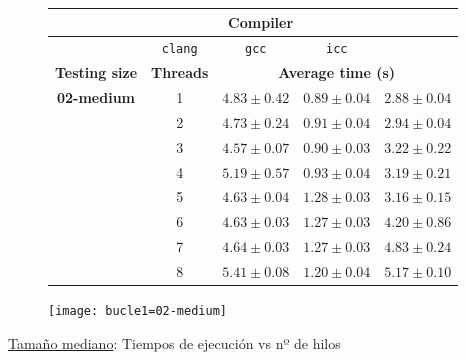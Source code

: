 \begin{figure}[H]
    \centering
    \begin{subfigure}{0.4\textwidth}
        \begin{adjustbox}{width=\textwidth} 
        \begin{tabular}{|c|c|c|c|c|}
            \hline
            \rowcolor{azul} \multicolumn{2}{|c|}{}&\multicolumn{3}{c|}{\textbf{Compiler}} \\ \hline
            \rowcolor{azul} \multicolumn{2}{|c|}{}&\texttt{clang}&\texttt{gcc}&\texttt{icc}\\ \hline
            \rowcolor{azul} \textbf{Testing size} & \textbf{Threads}&\multicolumn{3}{c|}{\textbf{Average time (s)}} \\ \hline
            \multirow{8}{2.5cm}{\textbf{02-medium}} & 1 & \(4.83\pm{0.42}\) & \(0.89\pm{0.04}\) & \(2.88\pm{0.04}\) \\ \cline{2-5}
            & 2 & \(4.73\pm{0.24}\) & \(0.91\pm{0.04}\) & \(2.94\pm{0.04}\) \\ \cline{2-5}
            & 3 & \(4.57\pm{0.07}\) & \(0.90\pm{0.03}\) & \(3.22\pm{0.22}\) \\ \cline{2-5}
            & 4 & \(5.19\pm{0.57}\) & \(0.93\pm{0.04}\) & \(3.19\pm{0.21}\) \\ \cline{2-5}
            & 5 & \(4.63\pm{0.04}\) & \(1.28\pm{0.03}\) & \(3.16\pm{0.15}\) \\ \cline{2-5}
            & 6 & \(4.63\pm{0.03}\) & \(1.27\pm{0.03}\) & \(4.20\pm{0.86}\) \\ \cline{2-5}
            & 7 & \(4.64\pm{0.03}\) & \(1.27\pm{0.03}\) & \(4.83\pm{0.24}\) \\ \cline{2-5}
            & 8 & \(5.41\pm{0.08}\) & \(1.20\pm{0.04}\) & \(5.17\pm{0.10}\) \\ \hline
        \end{tabular}
        \end{adjustbox}
    \end{subfigure}
    \hfill
    \begin{subfigure}{0.5\textwidth}
        \texttt{[image: bucle1=02-medium]}
    \end{subfigure}
    \caption{\underline{Tamaño mediano}: Tiempos de ejecución vs nº de hilos}
    \label{bucle1=02-medium}
\end{figure}

